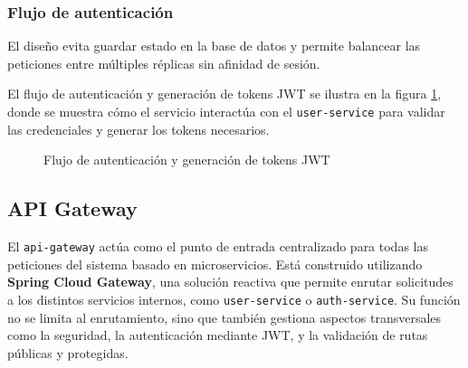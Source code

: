 \subsubsection*{Flujo de autenticación}

El diseño evita guardar estado en la base de datos y permite balancear las peticiones entre múltiples
réplicas sin afinidad de sesión.  

El flujo de autenticación y generación de tokens JWT se ilustra en la figura \ref{fig:auth-service-class-diagram}, donde se muestra cómo el servicio interactúa con el \texttt{user-service} para validar las credenciales y generar los tokens necesarios.

\begin{figure}[H]
    \centering
    \caption{Flujo de autenticación y generación de tokens JWT}
    \label{fig:auth-service-class-diagram}
\end{figure}

\subsection{API Gateway}
El \texttt{api-gateway} actúa como el punto de entrada centralizado para todas las peticiones del sistema basado en microservicios. Está construido utilizando \textbf{Spring Cloud Gateway}, una solución reactiva que permite enrutar solicitudes a los distintos servicios internos, como \texttt{user-service} o \texttt{auth-service}. Su función no se limita al enrutamiento, sino que también gestiona aspectos transversales como la seguridad, la autenticación mediante JWT, y la validación de rutas públicas y protegidas.

